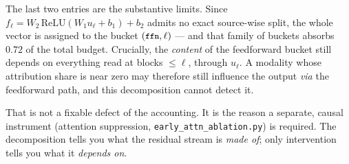 \documentclass[11pt]{article}
\theoremstyle{plain}
\theoremstyle{remark}
\newcommand{\code}[1]{\texttt{\small #1}}
\begin{document}
\medskip
\noindent
The last two entries are the substantive limits. Since
$f_\ell = W_2\,\mathrm{ReLU}(W_1 u_\ell + b_1) + b_2$ admits no exact
source-wise split, the whole vector is assigned to the bucket
$(\code{ffn},\ell)$ --- and that family of buckets absorbs $0.72$ of the total
budget. Crucially, the \emph{content} of the feedforward bucket still depends
on everything read at blocks $\le \ell$, through $u_\ell$. A modality whose
attribution share is near zero may therefore still influence the output
\emph{via} the feedforward path, and this decomposition cannot detect it.

That is not a fixable defect of the accounting. It is the reason a separate,
causal instrument (attention suppression, \code{early\_attn\_ablation.py})
is required. The decomposition tells you what the residual stream is
\emph{made of}; only intervention tells you what it \emph{depends on}.
\end{document}
